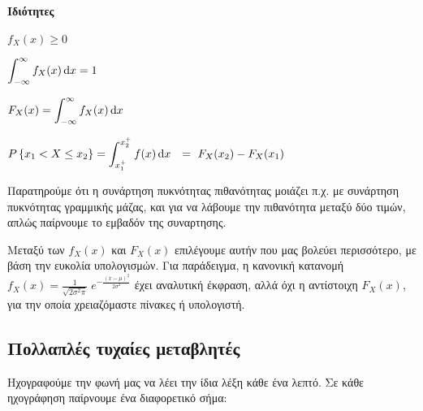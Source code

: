 \documentclass[11pt,a4paper,notitlepage,fleqn,final]{article}
\begin{document}
	\paragraph{Ιδιότητες}
	\begin{enumroman}
		\item \( f_X(x) \geq 0 \)
		\item \( \displaystyle
		\int_{-\infty}^{\infty} f_X(x) \mathop{}\!\mathrm{d} x = 1\)
		\item \( \displaystyle
		F_X(x) = \int_{-\infty}^{\infty} f_X(x)\mathop{}\!\mathrm{d} x \)
		\item \( \displaystyle
		P\left\lbrace x_1 < X \leq x_2 \right\rbrace 
		= \int_{x_1^+}^{x_2^+} f(x)\dif x \quad
		\mathsmaller{=\ F_X(x_2) - F_X(x_1)}
		\)
	\end{enumroman}
	
	\begin{center}
	\end{center}
	
	Παρατηρούμε ότι η συνάρτηση πυκνότητας πιθανότητας μοιάζει π.χ. με
	συνάρτηση πυκνότητας γραμμικής μάζας, και για να λάβουμε την
	πιθανότητα μεταξύ δύο τιμών, απλώς παίρνουμε το εμβαδόν της
	συναρτησης.
	
	Μεταξύ των \( f_X(x) \) και \( F_X(x) \) επιλέγουμε αυτήν που μας
	βολεύει περισσότερο, με βάση την ευκολία υπολογισμών. Για
	παράδειγμα, η κανονική κατανομή \( f_X(x) =
	\frac{1}{\sqrt{2\sigma^2\pi} } \; e^{ -\frac{(x-\mu)^2}{2\sigma^2} } 
	\) έχει αναλυτική έκφραση, αλλά όχι η αντίστοιχη \( F_X(x) \), για
	την οποία χρειαζόμαστε πίνακες ή υπολογιστή.
	
	\subsection{Πολλαπλές τυχαίες μεταβλητές}
	Ηχογραφούμε την φωνή μας να λέει την ίδια λέξη κάθε ένα λεπτό. Σε
	κάθε ηχογράφηση παίρνουμε ένα διαφορετικό σήμα:
	
	
\end{document}
